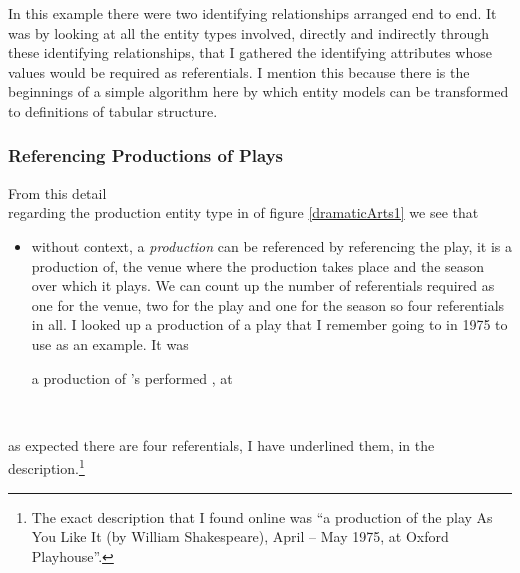 \begin{notebox}
In this example there were two identifying relationships arranged end to end. It was by looking at all the entity types involved, directly and indirectly through these identifying relationships,
 that I gathered the identifying attributes whose values would be required as referentials. 
I mention this because there is the beginnings of a simple algorithm here by which entity models can be transformed to definitions of tabular structure.
\end{notebox}

\subsubsection{Referencing Productions of Plays}
From this detail 
\begin{equation*}

\end{equation*}
regarding the production entity type in  of figure \ref{dramaticArts1} we see that
\begin{itemize}
  \item
  without context, a \textit{production} can be referenced by referencing the play, it is a production of, 
  the venue where the production takes place and the season 
  over which it plays. 
  We can count up the number of referentials required
  as one for the venue, two for the play and one for the season so four referentials in all. 
  I looked up a production of a play that I remember going to in 1975
  to use as an example. 
  It was
\begin{erquote}
\parbox{9cm}{a production of \mbox{'s} 
 performed \mbox{,} at }\\
\end{erquote}
\end{itemize}
as expected there are four referentials, I have underlined them, in the description.\footnote{
The exact description that I found online was ``a production of the play As You Like It (by William Shakespeare), April – May 1975, at Oxford Playhouse''.  
} 

